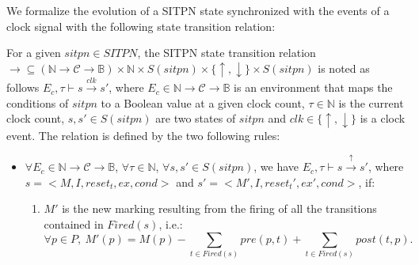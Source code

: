 We formalize the evolution of a SITPN state synchronized with the
events of a clock signal with the following state transition relation:

\begin{definition}
  \label{def:semantics}
  For a given $sitpn\in{}SITPN$, the SITPN state transition relation
  $\rightarrow\subseteq{}(\mathbb{N}\rightarrow\mathcal{C}\rightarrow\mathbb{B})\times{}\mathbb{N}\times{}S(sitpn)\times{}\{\uparrow,\downarrow\}\times{}S(sitpn)$
  is noted as follows $E_c,\tau\vdash{}s\xrightarrow{clk}s'$, where
  $E_c\in\mathbb{N}\rightarrow\mathcal{C}\rightarrow\mathbb{B}$ is an
  environment that maps the conditions of $sitpn$ to a Boolean value
  at a given clock count, $\tau\in\mathbb{N}$ is the current clock
  count, $s,s'\in{}S(sitpn)$ are two states of $sitpn$ and
  $clk\in\{\uparrow,\downarrow\}$ is a clock event. The relation is
  defined by the two following rules:
  
  \begin{itemize}
  \item
    $\forall{}E_c\in\mathbb{N}\rightarrow\mathcal{C}\rightarrow\mathbb{B}$,
    $\forall\tau\in\mathbb{N}$, $\forall{}s,s'\in{}S(sitpn)$, we have
    $E_c,\tau\vdash{}s\xrightarrow{\uparrow}s'$, where
    $s=<M,I,reset_t,ex,cond>$ and $s'=<M',I,reset_t',ex',cond>$, if:
    \begin{enumerate}
    \item\label{it:new-marking} $M'$ is the new marking resulting
      from
      the firing of all the transitions contained in $Fired(s)$, i.e.:
      \begin{equation*}
        \forall{}p\in{}P,~M'(p)=M(p)-\sum\limits_{t\in{}Fired(s)}pre(p,t)+\sum\limits_{t\in{}Fired(s)}post(t,p).
      \end{equation*}
      

\end{enumerate}
\end{itemize}
\end{definition}
